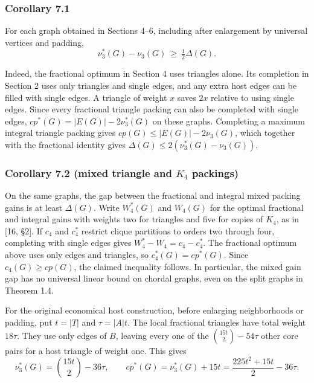 \documentclass[english,11pt,a4paper]{article}
\begin{document}
\subsubsection{Corollary 7.1}\label{corollary-7.1}

For each graph obtained in Sections 4--6, including after enlargement by universal vertices and padding,
\[\nu_3^*(G)-\nu_3(G)\ \ge\ \tfrac12\Delta(G).\]

Indeed, the fractional optimum in Section 4 uses triangles alone. Its completion in Section 2 uses only triangles and single edges, and any extra host edges can be filled with single edges. A triangle of weight \(x\) saves \(2x\) relative to using single edges. Since every fractional triangle packing can also be completed with single edges, \(cp^*(G)=|E(G)|-2\nu_3^*(G)\) on these graphs. Completing a maximum integral triangle packing gives \(cp(G)\le |E(G)|-2\nu_3(G)\), which together with the fractional identity gives \(\Delta(G)\le2(\nu_3^*(G)-\nu_3(G))\).

\subsubsection{\texorpdfstring{Corollary 7.2 (mixed triangle and \(K_4\) packings)}{Corollary 7.2 (mixed triangle and K\_4 packings)}}\label{corollary-7.2-mixed-triangle-and-k_4-packings}

On the same graphs, the gap between the fractional and integral mixed packing gains is at least \(\Delta(G)\). Write \(W_4^*(G)\) and \(W_4(G)\) for the optimal fractional and integral gains with weights two for triangles and five for copies of \(K_4\), as in {[}16, §2{]}. If \(c_4\) and \(c_4^*\) restrict clique partitions to orders two through four, completing with single edges gives \(W_4^*-W_4=c_4-c_4^*\). The fractional optimum above uses only edges and triangles, so \(c_4^*(G)=cp^*(G)\). Since \(c_4(G)\ge cp(G)\), the claimed inequality follows. In particular, the mixed gain gap has no universal linear bound on chordal graphs, even on the split graphs in Theorem 1.4.

For the original economical host construction, before enlarging neighborhoods or padding, put \(t=|T|\) and \(\tau=|A|t\). The local fractional triangles have total weight \(18\tau\). They use only edges of \(B\), leaving every one of the \(\binom{15t}{2}-54\tau\) other core pairs for a host triangle of weight one. This gives
\[\nu_3^*(G)=\binom{15t}{2}-36\tau,\qquad
cp^*(G)=\nu_3^*(G)+15t=\frac{225t^2+15t}{2}-36\tau.\]
\end{document}
